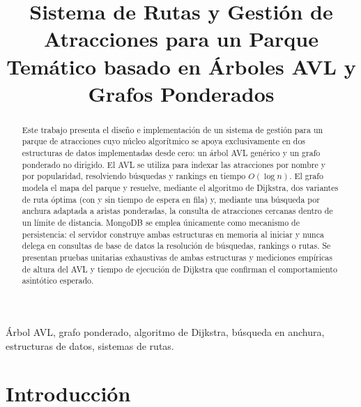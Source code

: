 \documentclass[conference]{IEEEtran}
\begin{document}
\title{Sistema de Rutas y Gesti\'on de Atracciones para un Parque Tem\'atico basado en \'Arboles AVL y Grafos Ponderados}

\author{
}

\maketitle

\begin{abstract}
Este trabajo presenta el dise\~no e implementaci\'on de un sistema de gesti\'on
para un parque de atracciones cuyo n\'ucleo algor\'itmico se apoya exclusivamente
en dos estructuras de datos implementadas desde cero: un \'arbol AVL gen\'erico
y un grafo ponderado no dirigido. El AVL se utiliza para indexar las
atracciones por nombre y por popularidad, resolviendo b\'usquedas y rankings en
tiempo $O(\log n)$. El grafo modela el mapa del parque y resuelve, mediante el
algoritmo de Dijkstra, dos variantes de ruta \'optima (con y sin tiempo de
espera en fila) y, mediante una b\'usqueda por anchura adaptada a aristas
ponderadas, la consulta de atracciones cercanas dentro de un l\'imite de
distancia. MongoDB se emplea \'unicamente como mecanismo de persistencia: el
servidor construye ambas estructuras en memoria al iniciar y nunca delega en
consultas de base de datos la resoluci\'on de b\'usquedas, rankings o rutas. Se
presentan pruebas unitarias exhaustivas de ambas estructuras y mediciones
emp\'iricas de altura del AVL y tiempo de ejecuci\'on de Dijkstra que confirman
el comportamiento asint\'otico esperado.
\end{abstract}

\begin{IEEEkeywords}
\'Arbol AVL, grafo ponderado, algoritmo de Dijkstra, b\'usqueda en anchura,
estructuras de datos, sistemas de rutas.
\end{IEEEkeywords}

\section{Introducci\'on}
\end{document}

